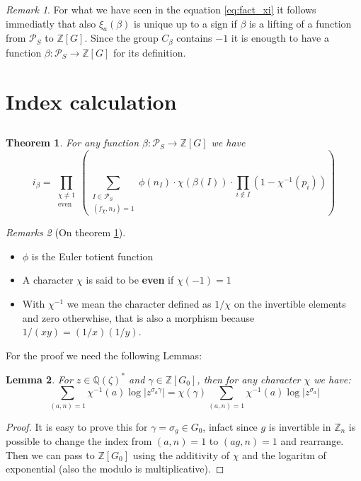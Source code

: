 \documentclass[]{article}
\theoremstyle{plain}
\newtheorem{teo}{Theorem}[section]
\newtheorem{lem}[teo]{Lemma}
\theoremstyle{remark}
\newtheorem{rem}{Remark}
\newtheorem{rems}[rem]{Remarks}
\theoremstyle{definition}
\newcommand{\PS}{\mathcal{P}_S}
\newcommand{\Z}{\mathbb{Z}}
\newcommand{\Q}{\mathbb{Q}}
\begin{document}
	\begin{rem}
		For what we have seen in the equation \ref{eq:fact_xi} it follows immediatly that also $ \xi_a(\beta) $ is unique up to a sign if $\beta$ is a lifting of a function from $ \PS $ to $ \Z[G] $. Since the group $ C_\beta $ contains $ -1 $ it is enougth to have a function $ \beta : \PS \to \Z[G]$ for its definition.
	\end{rem}

	\section{Index calculation}
	\subsection*{}
	\begin{teo}
		\label{teo:idx1}
		For any function $ \beta : \PS \to \Z [G] $ we have
		\begin{equation}
		\label{eq:idx1}
			i_\beta = \prod_{ \substack{\chi \neq 1 \\ \text{even}}} \left( \sum_{\substack{ I \in \PS \\ (f_\chi , n_I) = 1}} \phi (n_I) \cdot \chi (\beta (I)) \cdot \prod_{i \not \in  I} (1- \chi^{-1} (p_i)) \right) 
		\end{equation}
	\end{teo}

	\begin{rems}[On theorem \ref{teo:idx1}]
		\begin{itemize}
			\item $\phi$ is the Euler totient function
			\item A character $\chi$ is said to be \textbf{even} if $ \chi (-1) = 1 $
			\item With $ \chi^{-1} $ we mean the character defined as $ 1/\chi $ on the invertible elements and zero otherwhise, that is also a morphism because $ 1/(xy) = (1/x)(1/y)$.
			
			
		\end{itemize}
	\end{rems}

	For the proof we need the following Lemmas:
	
	\begin{lem} \label{lem:fact}
		For $ z \in \Q (\zeta )^\ast  $ and $ \gamma \in \Z [G_0] $, then for any character $\chi$ we have:
		\begin{equation} \label{eq:fact}
			\sum_{(a,n)=1} \chi ^{-1} (a) \log | z ^{\sigma_a \gamma }| = \chi (\gamma) \sum_{(a,n)=1} \chi ^{-1}(a) \log | z ^{\sigma_a  }|
		\end{equation}
	\end{lem}
	\begin{proof}
		It is easy to prove this for $\gamma = \sigma_g \in G_0$, infact since $ g $ is invertible in $ \Z_{n} $ is possible to change the index from $ (a,n)=1 $ to $ (ag,n)=1 $ and rearrange. Then we can pass to $ \Z[G_0] $ using the additivity of $ \chi $ and the logaritm of exponential (also the modulo is multiplicative).
	\end{proof}
\end{document}
